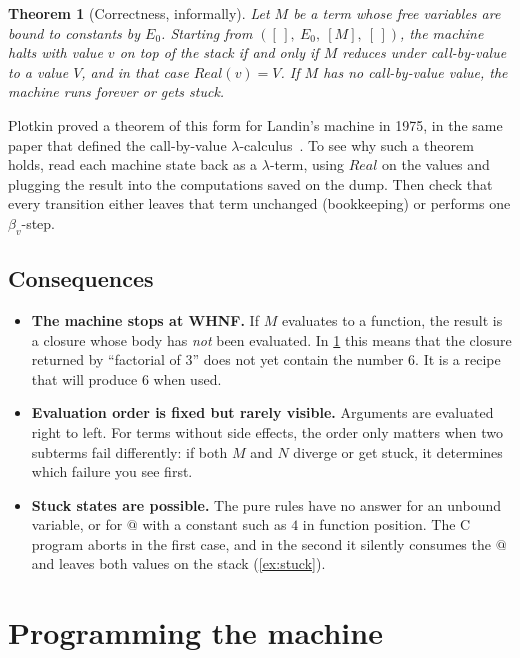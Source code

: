 \documentclass[11pt,a4paper]{article}
\makeatletter
\newcommand{\ap}{\mathtt{@}}
\newcommand{\emp}{[\,]}
\newcommand{\Real}{\mathit{Real}}
\newcommand{\st}[4]{(#1,\ #2,\ #3,\ #4)}
\theoremstyle{definition}
\theoremstyle{plain}
\newtheorem{theorem}{Theorem}
\makeatother
\begin{document}
\begin{theorem}[Correctness, informally]
Let $M$ be a term whose free variables are bound to constants by $E_0$.
Starting from $\st{\emp}{E_0}{[M]}{\emp}$, the machine halts with value
$v$ on top of the stack if and only if $M$ reduces under call-by-value to a
value $V$, and in that case $\Real(v) = V$. If $M$ has no call-by-value
value, the machine runs forever or gets stuck.
\end{theorem}

Plotkin proved a theorem of this form for Landin's machine in 1975, in the same
paper that defined the call-by-value $\lambda$-calculus~\cite{plotkin75}.
To see why such a theorem holds, read each machine state back as a
$\lambda$-term, using $\Real$ on the values and plugging the result into the
computations saved on the dump. Then check that every transition either leaves
that term unchanged (bookkeeping) or performs one $\beta_v$-step.

\subsection{Consequences}

\begin{itemize}
\item \textbf{The machine stops at WHNF.} If $M$ evaluates to a function, the
  result is a closure whose body has \emph{not} been evaluated. In
  \cref{sec:programming} this means that the closure returned by
  ``factorial of 3'' does not yet contain the number 6. It is a recipe that
  will produce 6 when used.
\item \textbf{Evaluation order is fixed but rarely visible.} Arguments are
  evaluated right to left. For terms without side effects, the order only
  matters when two subterms fail differently: if both $M$ and $N$ diverge or
  get stuck, it determines which failure you see first.
\item \textbf{Stuck states are possible.} The pure rules have no answer for
  an unbound variable, or for $\ap$ with a constant such as $4$ in function
  position. The C program aborts in the first case, and in the second it
  silently consumes the $\ap$ and leaves both values on the stack
  (\cref{ex:stuck}).
\end{itemize}

\section{Programming the machine}\label{sec:programming}
\end{document}
